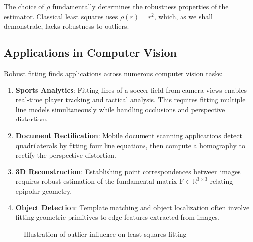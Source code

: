 \documentclass[12pt]{article}
\renewcommand{\vec}[1]{\mathbf{#1}}
\newcommand{\R}{\mathbb{R}}
\theoremstyle{definition}
\begin{document}
The choice of $\rho$ fundamentally determines the robustness properties of the estimator. Classical least squares uses $\rho(r) = r^2$, which, as we shall demonstrate, lacks robustness to outliers.

\subsection{Applications in Computer Vision}

Robust fitting finds applications across numerous computer vision tasks:

\begin{enumerate}[label=(\roman*)]
    \item \textbf{Sports Analytics}: Fitting lines of a soccer field from camera views enables real-time player tracking and tactical analysis. This requires fitting multiple line models simultaneously while handling occlusions and perspective distortions.

    \item \textbf{Document Rectification}: Mobile document scanning applications detect quadrilaterals by fitting four line equations, then compute a homography to rectify the perspective distortion.

    \item \textbf{3D Reconstruction}: Establishing point correspondences between images requires robust estimation of the fundamental matrix $\vec{F} \in \R^{3 \times 3}$ relating epipolar geometry.

    \item \textbf{Object Detection}: Template matching and object localization often involve fitting geometric primitives to edge features extracted from images.
\end{enumerate}

\begin{figure}[h]
    \centering
    \caption{Illustration of outlier influence on least squares fitting}
\end{figure}
\end{document}
